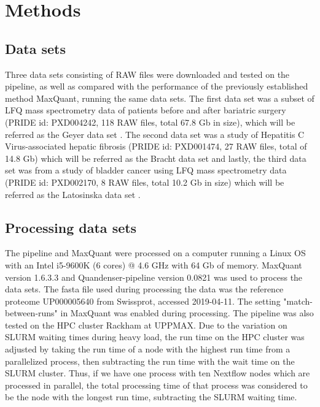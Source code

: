 \documentclass[11pt]{article}
\begin{document}
\section*{Methods}

\subsection*{Data sets}
Three data sets consisting of RAW files were downloaded and tested on the pipeline, as well as compared with the performance of the previously established method MaxQuant, running the same data sets. The first data set was a subset of LFQ mass spectrometry data of patients before and after bariatric surgery (PRIDE id: PXD004242, 118 RAW files, total 67.8 Gb in size), which will be referred as the Geyer data set \cite{geyer2016bartric}. The second data set was a study of Hepatitis C Virus-associated hepatic fibrosis (PRIDE id: PXD001474, 27 RAW files, total of 14.8 Gb) which will be referred as the Bracht data set and lastly, the third data set was from a study of bladder cancer using LFQ mass spectrometry data (PRIDE id: PXD002170, 8 RAW files, total 10.2 Gb in size) which will be referred as the Latosinska data set \cite{bracht2015analysis} \cite{latosinska2015comparative}.

\subsection*{Processing data sets}
The pipeline and MaxQuant were processed on a computer running a Linux OS with an Intel i5-9600K (6 cores) @ 4.6 GHz with 64 Gb of memory. MaxQuant version 1.6.3.3 and Quandenser-pipeline version 0.0821 was used to process the data sets. The fasta file used during processing the data was the reference proteome UP000005640 from Swissprot, accessed 2019-04-11. The setting "match-between-runs" in MaxQuant was enabled during processing. The pipeline was also tested on the HPC cluster Rackham at UPPMAX. Due to the variation on SLURM waiting times during heavy load, the run time on the HPC cluster was adjusted by taking the run time of a node with the highest run time from a parallelized process, then subtracting the run time with the wait time on the SLURM cluster. Thus, if we have one process with ten Nextflow nodes which are processed in parallel, the total processing time of that process was considered to be the node with the longest run time, subtracting the SLURM waiting time.
\end{document}
